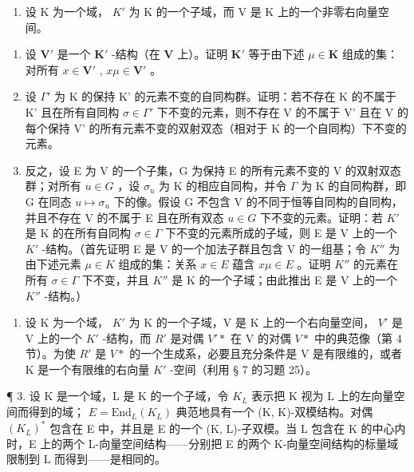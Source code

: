 \BourbakiExercisesSection

\begin{enumerate}
\def\labelenumi{\arabic{enumi}.}
\tightlist
\item
  设 K 为一个域， \(K'\) 为 K 的一个子域，而 V 是 K 上的一个非零右向量空间。
\end{enumerate}

\begin{enumerate}
\def\labelenumi{(\alph{enumi})}
\item
  设 \(\mathbf{V}'\) 是一个 \(\mathbf{K}'\) -结构（在 \(\mathbf{V}\) 上）。证明 \(\mathbf{K}'\) 等于由下述 \(\mu \in \mathbf{K}\) 组成的集：对所有 \(x \in \mathbf{V}'\) , \(x\mu \in \mathbf{V}'\) 。
\item
  设 \(\Gamma'\) 为 K 的保持 K' 的元素不变的自同构群。证明：若不存在 K 的不属于 K' 且在所有自同构 \(\sigma \in \Gamma'\) 下不变的元素，则不存在 V 的不属于 V' 且在 V 的每个保持 V' 的所有元素不变的双射双态（相对于 K 的一个自同构）下不变的元素。
\item
  反之，设 E 为 V 的一个子集，G 为保持 E 的所有元素不变的 V 的双射双态群；对所有 \(u \in G\) ，设 \(\sigma_{u}\) 为 K 的相应自同构，并令 \(\Gamma\) 为 K 的自同构群，即 G 在同态 \(u \mapsto \sigma_{u}\) 下的像。假设 G 不包含 V 的不同于恒等自同构的自同构，并且不存在 V 的不属于 E 且在所有双态 \(u \in G\) 下不变的元素。证明：若 \(K'\) 是 K 的在所有自同构 \(\sigma \in \Gamma\) 下不变的元素所成的子域，则 E 是 V 上的一个 \(K'\) -结构。（首先证明 E 是 V 的一个加法子群且包含 V 的一组基；令 \(K''\) 为由下述元素 \(\mu \in K\) 组成的集：关系 \(x \in E\) 蕴含 \(x\mu \in E\) 。证明 \(K''\) 的元素在所有 \(\sigma \in \Gamma\) 下不变，并且 \(K''\) 是 K 的一个子域；由此推出 E 是 V 上的一个 \(K''\) -结构。）
\end{enumerate}

\begin{enumerate}
\def\labelenumi{\arabic{enumi}.}
\setcounter{enumi}{1}
\tightlist
\item
  设 K 为一个域， \(K'\) 为 K 的一个子域，V 是 K 上的一个右向量空间， \(V'\) 是 V 上的一个 \(K'\) -结构，而 \(R'\) 是对偶 \(V'*\) 在 V 的对偶 \(V*\) 中的典范像（第 4 节）。为使 \(R'\) 是 \(V*\) 的一个生成系，必要且充分条件是 V 是有限维的，或者 K 是一个有限维的右向量 \(K'\) -空间（利用 § 7 的习题 25）。
\end{enumerate}

¶ 3. 设 K 是一个域，L 是 K 的一个子域，令 \(K_{L}\) 表示把 K 视为 L 上的左向量空间而得到的域； \(E = \text{End}_{L}(K_{L})\) 典范地具有一个 (K, K)-双模结构。对偶 \((K_{L})^{*}\) 包含在 E 中，并且是 E 的一个 (K, L)-子双模。当 L 包含在 K 的中心内时，E 上的两个 L-向量空间结构——分别把 E 的两个 K-向量空间结构的标量域限制到 L 而得到——是相同的。

